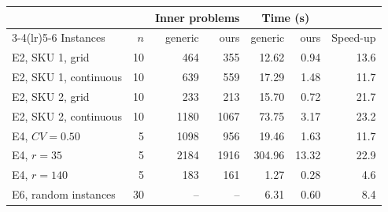 \begin{tabular}{@{}lrrrrrr@{}}
\toprule
 & & \multicolumn{2}{c}{Inner problems} & \multicolumn{2}{c}{Time (s)} & \\
\cmidrule(lr){3-4}\cmidrule(lr){5-6}
Instances & $n$ & generic & ours & generic & ours & Speed-up \\
\midrule
E2, SKU 1, grid & 10 & 464 & 355 & 12.62 & 0.94 & 13.6 \\
E2, SKU 1, continuous & 10 & 639 & 559 & 17.29 & 1.48 & 11.7 \\
E2, SKU 2, grid & 10 & 233 & 213 & 15.70 & 0.72 & 21.7 \\
E2, SKU 2, continuous & 10 & 1180 & 1067 & 73.75 & 3.17 & 23.2 \\
E4, $CV=0.50$ & 5 & 1098 & 956 & 19.46 & 1.63 & 11.7 \\
E4, $r=35$ & 5 & 2184 & 1916 & 304.96 & 13.32 & 22.9 \\
E4, $r=140$ & 5 & 183 & 161 & 1.27 & 0.28 & 4.6 \\
E6, random instances & 30 & -- & -- & 6.31 & 0.60 & 8.4 \\
\bottomrule
\end{tabular}
